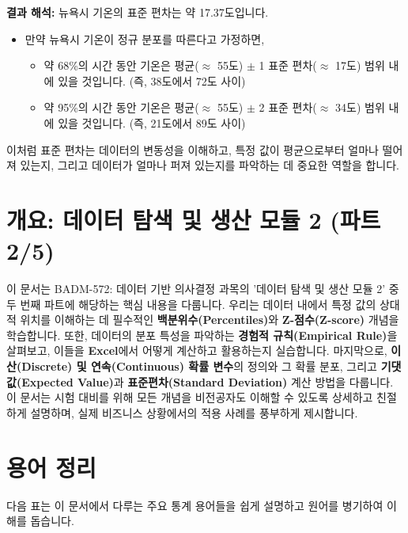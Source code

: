 \documentclass[11pt,a4paper]{book}
\theoremstyle{definition}
\begin{document}
\begin{examplebox}[title={Excel에서 표준 편차 계산하기 (\texttt{STDEV.S} 함수)}]
\textbf{결과 해석:}
뉴욕시 기온의 표준 편차는 약 17.37도입니다.
\begin{itemize}
    \item 만약 뉴욕시 기온이 정규 분포를 따른다고 가정하면,
    \begin{itemize}
        \item 약 68\%의 시간 동안 기온은 평균($\approx$ 55도) $\pm$ 1 표준 편차($\approx$ 17도) 범위 내에 있을 것입니다. (즉, 38도에서 72도 사이)
        \item 약 95\%의 시간 동안 기온은 평균($\approx$ 55도) $\pm$ 2 표준 편차($\approx$ 34도) 범위 내에 있을 것입니다. (즉, 21도에서 89도 사이)
    \end{itemize}
\end{itemize}
이처럼 표준 편차는 데이터의 변동성을 이해하고, 특정 값이 평균으로부터 얼마나 떨어져 있는지, 그리고 데이터가 얼마나 퍼져 있는지를 파악하는 데 중요한 역할을 합니다.
\end{examplebox}


\section{개요: 데이터 탐색 및 생산 모듈 2 (파트 2/5)}

\begin{overviewbox}
이 문서는 BADM-572: 데이터 기반 의사결정 과목의 '데이터 탐색 및 생산 모듈 2' 중 두 번째 파트에 해당하는 핵심 내용을 다룹니다. 우리는 데이터 내에서 특정 값의 상대적 위치를 이해하는 데 필수적인 \textbf{백분위수(Percentiles)}와 \textbf{Z-점수(Z-score)} 개념을 학습합니다. 또한, 데이터의 분포 특성을 파악하는 \textbf{경험적 규칙(Empirical Rule)}을 살펴보고, 이들을 \textbf{Excel}에서 어떻게 계산하고 활용하는지 실습합니다. 마지막으로, \textbf{이산(Discrete) 및 연속(Continuous) 확률 변수}의 정의와 그 확률 분포, 그리고 \textbf{기댓값(Expected Value)}과 \textbf{표준편차(Standard Deviation)} 계산 방법을 다룹니다. 이 문서는 시험 대비를 위해 모든 개념을 비전공자도 이해할 수 있도록 상세하고 친절하게 설명하며, 실제 비즈니스 상황에서의 적용 사례를 풍부하게 제시합니다.
\end{overviewbox}


\section{용어 정리}

다음 표는 이 문서에서 다루는 주요 통계 용어들을 쉽게 설명하고 원어를 병기하여 이해를 돕습니다.
\end{document}
